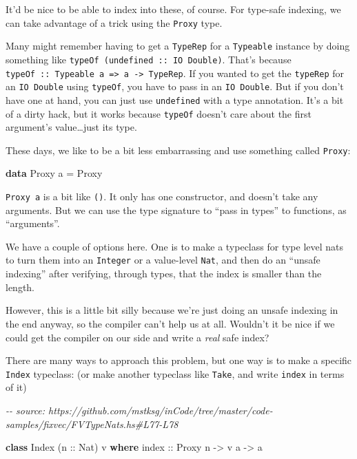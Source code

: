 \documentclass[]{article}
\newenvironment{Shaded}{}{}
\newcommand{\CommentTok}[1]{\textcolor[rgb]{0.38,0.63,0.69}{\textit{#1}}}
\newcommand{\DataTypeTok}[1]{\textcolor[rgb]{0.56,0.13,0.00}{#1}}
\newcommand{\KeywordTok}[1]{\textcolor[rgb]{0.00,0.44,0.13}{\textbf{#1}}}
\newcommand{\NormalTok}[1]{#1}
\newcommand{\OtherTok}[1]{\textcolor[rgb]{0.00,0.44,0.13}{#1}}
\begin{document}
It'd be nice to be able to index into these, of course. For type-safe indexing,
we can take advantage of a trick using the \texttt{Proxy} type.

Many might remember having to get a \texttt{TypeRep} for a \texttt{Typeable}
instance by doing something like \texttt{typeOf\ (undefined\ ::\ IO\ Double)}.
That's because
\texttt{typeOf\ ::\ Typeable\ a\ =\textgreater{}\ a\ -\textgreater{}\ TypeRep}.
If you wanted to get the \texttt{typeRep} for an \texttt{IO\ Double} using
\texttt{typeOf}, you have to pass in an \texttt{IO\ Double}. But if you don't
have one at hand, you can just use \texttt{undefined} with a type annotation.
It's a bit of a dirty hack, but it works because \texttt{typeOf} doesn't care
about the first argument's value\ldots just its type.

These days, we like to be a bit less embarrassing and use something called
\texttt{Proxy}:

\begin{Shaded}
\begin{Highlighting}[]
\KeywordTok{data} \DataTypeTok{Proxy}\NormalTok{ a }\OtherTok{=} \DataTypeTok{Proxy}
\end{Highlighting}
\end{Shaded}

\texttt{Proxy\ a} is a bit like \texttt{()}. It only has one constructor, and
doesn't take any arguments. But we can use the type signature to ``pass in
types'' to functions, as ``arguments''.

We have a couple of options here. One is to make a typeclass for type level nats
to turn them into an \texttt{Integer} or a value-level \texttt{Nat}, and then do
an ``unsafe indexing'' after verifying, through types, that the index is smaller
than the length.

However, this is a little bit silly because we're just doing an unsafe indexing
in the end anyway, so the compiler can't help us at all. Wouldn't it be nice if
we could get the compiler on our side and write a \emph{real} safe index?

There are many ways to approach this problem, but one way is to make a specific
\texttt{Index} typeclass: (or make another typeclass like \texttt{Take}, and
write \texttt{index} in terms of it)

\begin{Shaded}
\begin{Highlighting}[]
\CommentTok{{-}{-} source: https://github.com/mstksg/inCode/tree/master/code{-}samples/fixvec/FVTypeNats.hs\#L77{-}L78}

\KeywordTok{class} \DataTypeTok{Index}\NormalTok{ (}\OtherTok{n ::} \DataTypeTok{Nat}\NormalTok{) v }\KeywordTok{where}
\OtherTok{    index ::} \DataTypeTok{Proxy}\NormalTok{ n }\OtherTok{{-}>}\NormalTok{ v a }\OtherTok{{-}>}\NormalTok{ a}
\end{Highlighting}
\end{Shaded}
\end{document}
